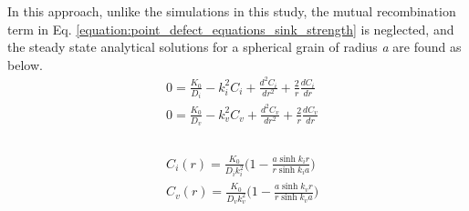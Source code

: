 \documentclass[a4paper]{article}
\begin{document}
  In this approach, unlike the simulations in this study, the mutual recombination term in Eq. \ref{equation:point_defect_equations_sink_strength} is neglected, and the steady state analytical solutions for a spherical grain of radius \textit{a} are found as below.\cite{heald1977}\\

  \begin{equation}
    \begin{aligned}
      &0 = \frac{K_0}{D_i} - k_i^2C_i + \frac{d^2C_i}{dr^2}+\frac{2}{r}\frac{dC_i}{dr}\\
      &0 = \frac{K_0}{D_v} - k_v^2C_v + \frac{d^2C_v}{dr^2}+\frac{2}{r}\frac{dC_v}{dr}\\
    \end{aligned}
    \label{equation:spherical_norecomb_point_defect_equations}
  \end{equation}\\
  \begin{equation}
    \begin{aligned}
      &C_i(r)=\frac{K_0}{D_ik_i^2}\bigg(1-\frac{a\sinh{k_ir}}{r\sinh{k_ia}}\bigg)\\
      &C_v(r)=\frac{K_0}{D_vk_v^2}\bigg(1-\frac{a\sinh{k_vr}}{r\sinh{k_va}}\bigg)\\
    \end{aligned}
    \label{equation:spherical_grain_analytical_solution}
  \end{equation}\\
\end{document}
